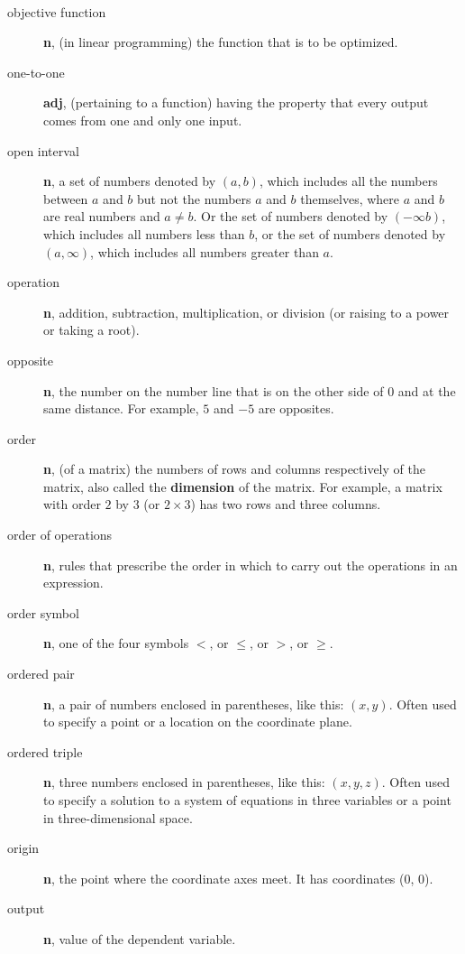 \documentclass[10pt,]{book}
\newcommand{\terminology}[1]{\textbf{#1}}
\theoremstyle{plain}
\theoremstyle{definition}
\theoremstyle{definition}
\theoremstyle{definition}
\numberwithin{equation}{part}
\newcommand{\lt}{<}
\newcommand{\gt}{>}
\begin{document}
\paragraph[{}]{}\hypertarget{paragraphs-18}{}
\leavevmode%
\begin{description}
\item[{objective function}]\hypertarget{li-701}{}\terminology{n}, (in linear programming) the function that is to be optimized.%
\item[{one-to-one}]\hypertarget{li-702}{}\terminology{adj}, (pertaining to a function) having the property that every output comes from one and only one input.%
\item[{open interval}]\hypertarget{li-703}{}\terminology{n}, a set of numbers denoted by \((a, b)\), which includes all the numbers between \(a\) and \(b\) but not the numbers \(a\) and \(b\) themselves, where \(a\) and \(b\) are real numbers and \(a \ne b\). Or the set of numbers denoted by \((−\infty b)\), which includes all numbers less than \(b\), or the set of numbers denoted by \((a, \infty)\), which includes all numbers greater than \(a\).%
\item[{operation}]\hypertarget{li-704}{}\terminology{n}, addition, subtraction, multiplication, or division (or raising to a power or taking a root).%
\item[{opposite}]\hypertarget{li-705}{}\terminology{n}, the number on the number line that is on the other side of \(0\) and at the same distance. For example, \(5\) and \(-5\) are opposites.%
\item[{order}]\hypertarget{li-706}{}\terminology{n}, (of a matrix) the numbers of rows and columns respectively of the matrix, also called the \terminology{dimension} of the matrix. For example, a matrix with order \(2\) by \(3\) (or \(2 \times 3\)) has two rows and three columns.%
\item[{order of operations}]\hypertarget{li-707}{}\terminology{n}, rules that prescribe the order in which to carry out the operations in an expression.%
\item[{order symbol}]\hypertarget{li-708}{}\terminology{n}, one of the four symbols \(\lt\), or \(\le\), or \(\gt\), or \(\ge\).%
\item[{ordered pair}]\hypertarget{li-709}{}\terminology{n}, a pair of numbers enclosed in parentheses, like this: \((x, y )\). Often used to specify a point or a location on the coordinate plane.%
\item[{ordered triple}]\hypertarget{li-710}{}\terminology{n}, three numbers enclosed in parentheses, like this: \((x, y, z)\). Often used to specify a solution to a system of equations in three variables or a point in three-dimensional space.%
\item[{origin}]\hypertarget{li-711}{}\terminology{n}, the point where the coordinate axes meet. It has coordinates (0, 0).%
\item[{output}]\hypertarget{li-712}{}\terminology{n}, value of the dependent variable.%
\end{description}
%
\typeout{************************************************}
\typeout{************************************************}
\end{document}
